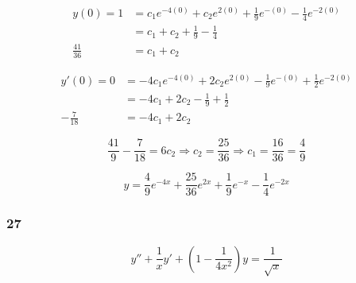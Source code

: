 \documentclass{article}
\begin{document}
\begin{align*}
  y(0) = 1      & = c_1 e^{-4 (0)} + c_2 e^{2 (0)} + \frac{1}{9} e^{-(0)} - \frac{1}{4} e^{-2 (0)} \\
                & = c_1 + c_2 + \frac{1}{9} - \frac{1}{4}                                          \\
  \frac{41}{36} & = c_1 + c_2
\end{align*}

\begin{align*}
  y'(0) = 0     & = -4 c_1 e^{-4 (0)} + 2 c_2 e^{2 (0)} - \frac{1}{9} e^{-(0)} + \frac{1}{2} e^{-2 (0)} \\
                & = -4 c_1 + 2 c_2 - \frac{1}{9} + \frac{1}{2}                                          \\
  -\frac{7}{18} & = -4 c_1 + 2 c_2
\end{align*}

\[\frac{41}{9} - \frac{7}{18} = 6 c_2 \Rightarrow c_2 = \frac{25}{36} \Rightarrow c_1 = \frac{16}{36} = \frac{4}{9}\]

\[y = \frac{4}{9} e^{-4x} + \frac{25}{36} e^{2x} + \frac{1}{9} e^{-x} - \frac{1}{4} e^{-2x}\]

\subsubsection{27}

\[y'' + \frac{1}{x} y' + \left( 1 - \frac{1}{4x^2} \right) y = \frac{1}{\sqrt{x}}\]
\end{document}
